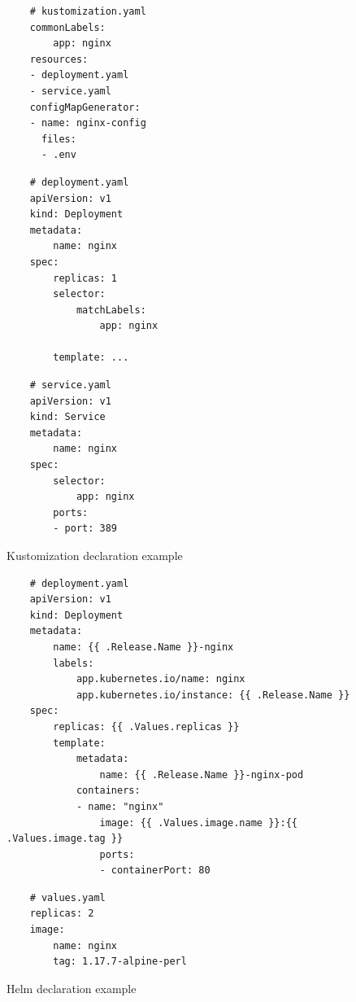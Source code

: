 \documentclass[11pt]{article}
\begin{document}
\begin{figure}[!h]
\centering
\begin{minipage}[t]{0.3\textwidth}
    \centering
    \begin{verbatim}
    # kustomization.yaml
    commonLabels:
        app: nginx
    resources:
    - deployment.yaml
    - service.yaml
    configMapGenerator:
    - name: nginx-config
      files:
      - .env
    \end{verbatim}
\end{minipage}
\begin{minipage}[t]{0.3\textwidth}
    \centering
    \begin{verbatim}
    # deployment.yaml
    apiVersion: v1
    kind: Deployment
    metadata:
        name: nginx
    spec:
        replicas: 1
        selector:
            matchLabels:
                app: nginx
        
        template: ...
\end{verbatim}
\end{minipage}
\begin{minipage}[t]{0.3\textwidth}
    \centering
    \begin{verbatim}
    # service.yaml
    apiVersion: v1
    kind: Service
    metadata:
        name: nginx
    spec:
        selector:
            app: nginx  
        ports:
        - port: 389
\end{verbatim}
\end{minipage}
\caption{Kustomization declaration example}
\label{fig:kustomization}
\end{figure}

\begin{figure}[!h]
    \centering
    \begin{verbatim}
    # deployment.yaml
    apiVersion: v1
    kind: Deployment
    metadata:
        name: {{ .Release.Name }}-nginx
        labels:
            app.kubernetes.io/name: nginx
            app.kubernetes.io/instance: {{ .Release.Name }}
    spec:
        replicas: {{ .Values.replicas }}
        template:
            metadata:
                name: {{ .Release.Name }}-nginx-pod
            containers:
            - name: "nginx"
                image: {{ .Values.image.name }}:{{ .Values.image.tag }}
                ports:
                - containerPort: 80
    \end{verbatim}
    \begin{verbatim}
    # values.yaml
    replicas: 2
    image:
        name: nginx
        tag: 1.17.7-alpine-perl
    \end{verbatim}
    \caption{Helm declaration example}
    \label{fig:helm}
\end{figure}
\end{document}
